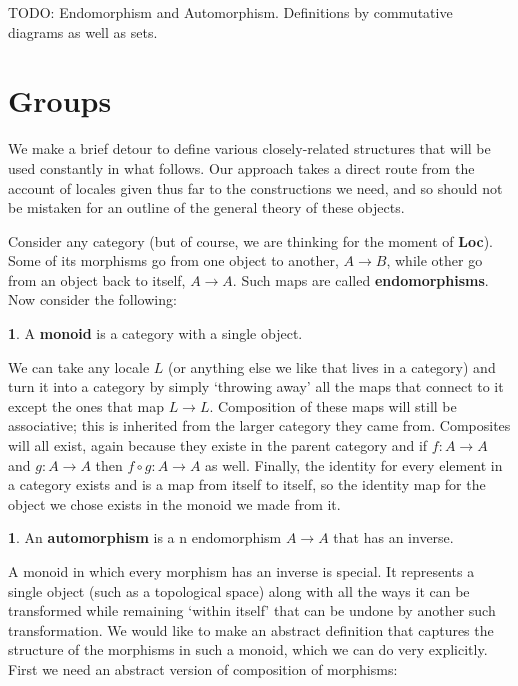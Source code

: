 \documentclass[oneside,english]{amsbook}
\numberwithin{section}{chapter}
\theoremstyle{plain}
\theoremstyle{definition}
\newtheorem{defn}[thm]{\protect\definitionname}
\providecommand{\definitionname}{Definition}
\begin{document}
TODO: Endomorphism and Automorphism. Definitions by commutative diagrams as well as sets.

\section{Groups}

We make a brief detour to define various closely-related structures that will be used constantly in what follows. Our approach takes a direct route from the account of locales given thus far to the constructions we need, and so should not be mistaken for an outline of the general theory of these objects.

Consider any category (but of course, we are thinking for the moment of \textbf{Loc}). Some of its morphisms go from one object to another, $A\to B$, while other go from an object back to itself, $A\to A$. Such maps are called \textbf{endomorphisms}. Now consider the following:

\begin{defn}
	A \textbf{monoid} is a category with a single object.
\end{defn}

We can take any locale $L$ (or anything else we like that lives in a category) and turn it into a category by simply `throwing away' all the maps that connect to it except the ones that map $L\to L$. Composition of these maps will still be associative; this is inherited from the larger category they came from. Composites will all exist, again because they existe in the parent category and if $f:A\to A$ and $g:A\to A$ then $f\circ g:A\to A$ as well. Finally, the identity for every element in a category exists and is a map from itself to itself, so the identity map for the object we chose exists in the monoid we made from it.

\begin{defn}
	An \textbf{automorphism} is a n endomorphism $A\to A$ that has an inverse.
\end{defn}

A monoid in which every morphism has an inverse is special. It represents a single object (such as a topological space) along with all the ways it can be transformed while remaining `within itself' that can be undone by another such transformation. We would like to make an abstract definition that captures the structure of the morphisms in such a monoid, which we can do very explicitly. First we need an abstract version of composition of morphisms:
\end{document}
